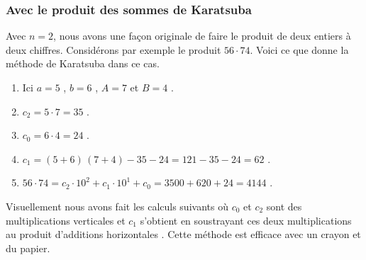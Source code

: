 \subsubsection{Avec le produit des sommes de Karatsuba}

Avec $n = 2$, nous avons une façon originale de faire le produit de deux entiers à deux chiffres. Considérons par exemple le produit $56 \cdot 74$. Voici ce que donne la méthode de Karatsuba dans ce cas.

\begin{enumerate}
    \item Ici $a = 5$ , $b = 6$ , $A = 7$ et $B = 4$ .

    \item $c_2 = 5 \cdot 7 = 35$ .

    \item $c_0 = 6 \cdot 4 = 24$ .

    \item $c_1 = (5 + 6) \, (7 + 4) - 35 - 24 = 121 - 35 - 24 = 62$ .

    \item $56 \cdot 74 = c_2 \cdot 10^2 + c_1 \cdot 10^1 + c_0 = 3500 + 620 + 24 = 4144$ .
\end{enumerate}

\medskip

Visuellement nous avons fait les calculs suivants où $c_0$ et $c_2$ sont des multiplications \og verticales \fg{} et $c_1$ s'obtient en soustrayant ces deux multiplications au produit \og d'additions horizontales \fg{}.
Cette méthode est efficace avec un crayon et du papier.

